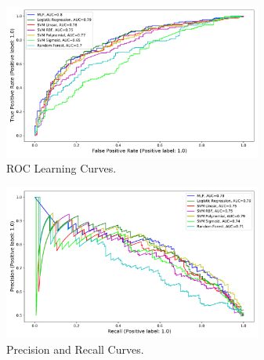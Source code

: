 \begin{figure}[ht]
\includegraphics[width=8.5cm]{plots/roccurves.pdf}
\caption{ROC Learning Curves.}

\label{fig:roc}
\centering
\end{figure}

\begin{figure}[ht]
\includegraphics[width=8.5cm]{plots/parcurve.pdf}
\caption{Precision and Recall Curves.}

\label{fig:par}
\centering
\end{figure}

